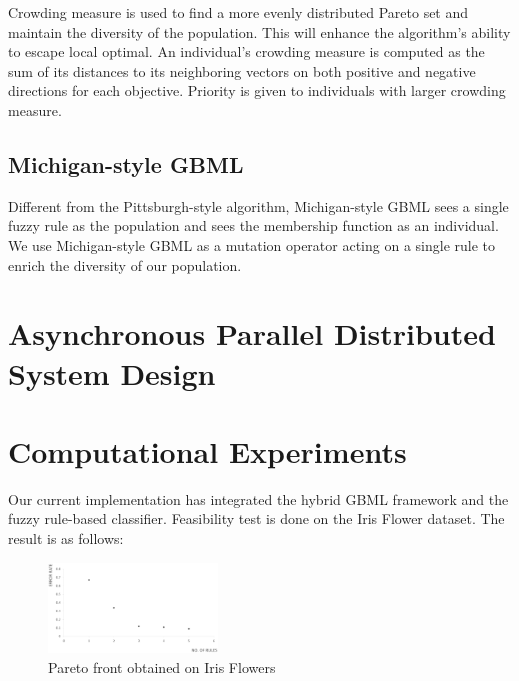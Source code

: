 \documentclass[conference]{IEEEtran}
\begin{document}
	 Crowding measure is used to find a more evenly distributed Pareto set and maintain the diversity of the population. This will enhance the algorithm's ability to escape local optimal. An individual's crowding measure is computed as the sum of its distances to its neighboring vectors on both positive and negative directions for each objective. Priority is given to individuals with larger crowding measure.
	 
	 \subsection{Michigan-style GBML}
	 
	 Different from the Pittsburgh-style algorithm, Michigan-style GBML sees a single fuzzy rule as the population and sees the membership function as an individual. We use Michigan-style GBML as a mutation operator acting on a single rule to enrich the diversity of our population. 
   
  
   
  \section{Asynchronous Parallel Distributed System Design}

  \section{Computational Experiments}
	 Our current implementation has integrated the hybrid GBML framework and the fuzzy rule-based classifier. Feasibility test is done on the Iris Flower dataset. The result is as follows:
 \begin{figure}[H]
 	\centering
 	\includegraphics[width=0.4\textwidth]{figures/iris.png}
 	\caption{Pareto front obtained on Iris Flowers}\label{fig:digit}
 \end{figure}
\end{document}

